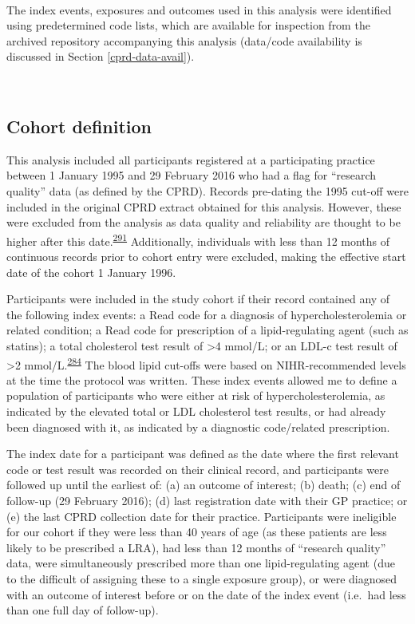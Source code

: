 \documentclass[a4paper, twoside]{templates/ociamthesis}
\begin{document}
~

The index events, exposures and outcomes used in this analysis were identified using predetermined code lists, which are available for inspection from the archived repository accompanying this analysis (data/code availability is discussed in Section \ref{cprd-data-avail}).

~

\hypertarget{cohort-definition}{%
\subsection{Cohort definition}\label{cohort-definition}}

This analysis included all participants registered at a participating practice between 1 January 1995 and 29 February 2016 who had a flag for ``research quality'' data (as defined by the CPRD). Records pre-dating the 1995 cut-off were included in the original CPRD extract obtained for this analysis. However, these were excluded from the analysis as data quality and reliability are thought to be higher after this date.\textsuperscript{\protect\hyperlink{ref-wolf2019}{291}} Additionally, individuals with less than 12 months of continuous records prior to cohort entry were excluded, making the effective start date of the cohort 1 January 1996.

Participants were included in the study cohort if their record contained any of the following index events: a Read code for a diagnosis of hypercholesterolemia or related condition; a Read code for prescription of a lipid-regulating agent (such as statins); a total cholesterol test result of \textgreater4 mmol/L; or an LDL-c test result of \textgreater2 mmol/L.\textsuperscript{\protect\hyperlink{ref-walker2016}{284}} The blood lipid cut-offs were based on NIHR-recommended levels at the time the protocol was written. These index events allowed me to define a population of participants who were either at risk of hypercholesterolemia, as indicated by the elevated total or LDL cholesterol test results, or had already been diagnosed with it, as indicated by a diagnostic code/related prescription.

The index date for a participant was defined as the date where the first relevant code or test result was recorded on their clinical record, and participants were followed up until the earliest of: (a) an outcome of interest; (b) death; (c) end of follow-up (29 February 2016); (d) last registration date with their GP practice; or (e) the last CPRD collection date for their practice. Participants were ineligible for our cohort if they were less than 40 years of age (as these patients are less likely to be prescribed a LRA), had less than 12 months of ``research quality'' data, were simultaneously prescribed more than one lipid-regulating agent (due to the difficult of assigning these to a single exposure group), or were diagnosed with an outcome of interest before or on the date of the index event (i.e.~had less than one full day of follow-up).
\end{document}
